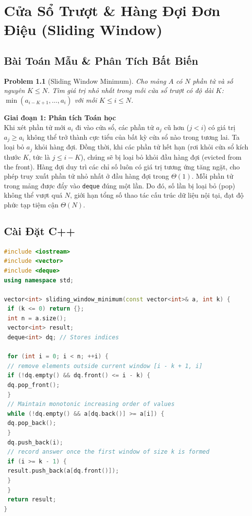 \documentclass[11pt, letterpaper]{report}
\newtheorem{baitoan}{Problem}[chapter]
\begin{document}
\chapter{Cửa Sổ Trượt \& Hàng Đợi Đơn Điệu (Sliding Window)}
\label{mod:sliding_window}

\section{Bài Toán Mẫu \& Phân Tích Bất Biến}
\begin{baitoan}[Sliding Window Minimum]
Cho mảng $A$ có $N$ phần tử và số nguyên $K \le N$. Tìm giá trị nhỏ nhất trong mỗi cửa sổ trượt có độ dài $K$: $\min(a_{i-K+1}, \dots, a_i)$ với mỗi $K \le i \le N$.
\end{baitoan}

\noindent\textbf{Giai đoạn 1: Phân tích Toán học}\\
Khi xét phần tử mới $a_i$ đi vào cửa sổ, các phần tử $a_j$ cũ hơn ($j < i$) có giá trị $a_j \ge a_i$ không thể trở thành cực tiểu của bất kỳ cửa sổ nào trong tương lai. Ta loại bỏ $a_j$ khỏi hàng đợi. Đồng thời, khi các phần tử hết hạn (rơi khỏi cửa sổ kích thước $K$, tức là $j \le i - K$), chúng sẽ bị loại bỏ khỏi đầu hàng đợi (evicted from the front). Hàng đợi duy trì các chỉ số luôn có giá trị tương ứng tăng ngặt, cho phép truy xuất phần tử nhỏ nhất ở đầu hàng đợi trong $\Theta(1)$. Mỗi phần tử trong mảng được đẩy vào \texttt{deque} đúng một lần. Do đó, số lần bị loại bỏ (pop) không thể vượt quá $N$, giới hạn tổng số thao tác cấu trúc dữ liệu nội tại, đạt độ phức tạp tiệm cận $\Theta(N)$.

\section{Cài Đặt C++}
\begin{lstlisting}[language=C++, caption={C++ Monotonic Deque for Sliding Window Minimum}]
#include <iostream>
#include <vector>
#include <deque>
using namespace std;

vector<int> sliding_window_minimum(const vector<int>& a, int k) {
 if (k <= 0) return {};
 int n = a.size();
 vector<int> result;
 deque<int> dq; // Stores indices
 
 for (int i = 0; i < n; ++i) {
 // remove elements outside current window [i - k + 1, i]
 if (!dq.empty() && dq.front() <= i - k) {
 dq.pop_front();
 }
 // Maintain monotonic increasing order of values
 while (!dq.empty() && a[dq.back()] >= a[i]) {
 dq.pop_back();
 }
 dq.push_back(i);
 // record answer once the first window of size k is formed
 if (i >= k - 1) {
 result.push_back(a[dq.front()]);
 }
 }
 return result;
}
\end{lstlisting}
\end{document}
